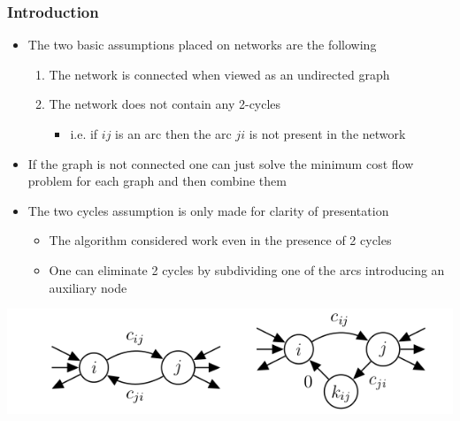 \documentclass[11pt]{article}
\begin{document}
\subsubsection{Introduction}
\label{sec:org51c9a53}
\begin{itemize}
\item The two basic assumptions placed on networks are the following
\begin{enumerate}
\item The network is connected when viewed as an undirected graph
\item The network does not contain any 2-cycles
\begin{itemize}
\item i.e. if \(ij\) is an arc then the arc \(ji\) is not present in the network
\end{itemize}
\end{enumerate}

\item If the graph is not connected one can just solve the minimum cost flow problem for each graph and then combine them
\item The two cycles assumption is only made for clarity of presentation
\begin{itemize}
\item The algorithm considered work even in the presence of 2 cycles
\item One can eliminate 2 cycles by subdividing one of the arcs introducing an auxiliary node
\end{itemize}
\end{itemize}
\begin{center}
\includegraphics[width=.9\linewidth]{Network Flows/screenshot_2019-03-03_14-26-34.png}
\end{center}
\end{document}
